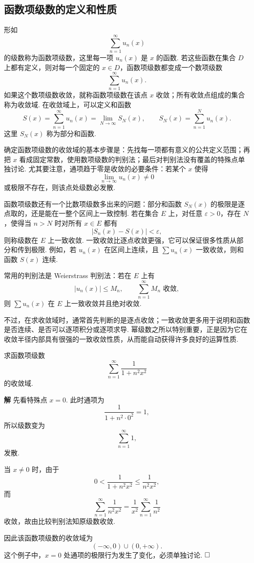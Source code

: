 \documentclass{ctexart}
\newenvironment{custom}[1]{\par\noindent \textbf{#1}\quad}{\par\vspace{1em}}
\begin{document}
\subsection{函数项级数的定义和性质}
形如
\[
\sum_{n=1}^{\infty}u_n(x)
\]
的级数称为函数项级数，这里每一项 $u_n(x)$ 是 $x$ 的函数. 若这些函数在集合 $D$ 上都有定义，则对每一个固定的 $x\in D$，函数项级数都变成一个数项级数
\[
\sum_{n=1}^{\infty}u_n(x).
\]
如果这个数项级数收敛，就称函数项级数在该点 $x$ 收敛；所有收敛点组成的集合称为收敛域. 在收敛域上，可以定义和函数
\[
S(x)=\sum_{n=1}^{\infty}u_n(x)=\lim_{N\to\infty}S_N(x),\qquad S_N(x)=\sum_{n=1}^{N}u_n(x).
\]
这里 $S_N(x)$ 称为部分和函数.

确定函数项级数的收敛域的基本步骤是：先找每一项都有意义的公共定义范围；再把 $x$ 看成固定常数，使用数项级数的判别法；最后对判别法没有覆盖的特殊点单独讨论. 尤其要注意，通项趋于零是收敛的必要条件：若某个 $x$ 使得
\[
\lim_{n\to\infty}u_n(x)\neq 0
\]
或极限不存在，则该点处级数必发散.

函数项级数还有一个比数项级数多出来的问题：部分和函数 $S_N(x)$ 的极限是逐点取的，还是能在一整个区间上一致控制. 若在集合 $E$ 上，对任意 $\varepsilon>0$，存在 $N$，使得当 $n>N$ 时对所有 $x\in E$ 都有
\[
|S_n(x)-S(x)|<\varepsilon,
\]
则称级数在 $E$ 上一致收敛. 一致收敛比逐点收敛更强，它可以保证很多性质从部分和传到极限. 例如，若 $u_n(x)$ 在区间上连续，且 $\sum u_n(x)$ 一致收敛，则和函数 $S(x)$ 连续.

常用的判别法是 Weierstrass 判别法：若在 $E$ 上有
\[
|u_n(x)|\leqslant M_n,
\qquad
\sum_{n=1}^{\infty}M_n \text{ 收敛},
\]
则 $\sum u_n(x)$ 在 $E$ 上一致收敛并且绝对收敛.

不过，在求收敛域时，通常首先判断的是逐点收敛；一致收敛更多用于说明和函数是否连续、是否可以逐项积分或逐项求导. 幂级数之所以特别重要，正是因为它在收敛半径内部具有很强的一致收敛性质，从而能自动获得许多良好的运算性质.

\begin{example}
求函数项级数
\[
\sum_{n=1}^{\infty}\frac{1}{1+n^2x^2}
\]
的收敛域.
\end{example}

\begin{custom}{解}
先看特殊点 $x=0$. 此时通项为
\[
\frac{1}{1+n^2\cdot 0^2}=1,
\]
所以级数变为
\[
\sum_{n=1}^{\infty}1,
\]
发散.

当 $x\neq 0$ 时，由于
\[
0<\frac{1}{1+n^2x^2}\leqslant \frac{1}{n^2x^2},
\]
而
\[
\sum_{n=1}^{\infty}\frac{1}{n^2x^2}
=\frac{1}{x^2}\sum_{n=1}^{\infty}\frac{1}{n^2}
\]
收敛，故由比较判别法知原级数收敛.

因此该函数项级数的收敛域为
\[
(-\infty,0)\cup(0,+\infty).
\]
这个例子中，$x=0$ 处通项的极限行为发生了变化，必须单独讨论. $\hfill{\square}$
\end{custom}
\end{document}
